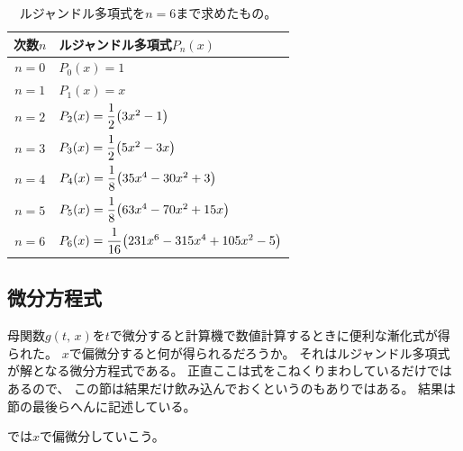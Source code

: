 \documentclass[../../master.tex]{subfiles}
\begin{document}
\begin{table}[htb]
	\centering
	\caption{ルジャンドル多項式を\(n=6\)まで求めたもの。}
	\begin{tabular}{cl}
		\hline
		次数\(n\) & ルジャンドル多項式\(P_n(x)\)                                   \\
		\hline \hline
		\(n=0\) & \(P_0(x)= 1\)                                         \\
		\(n=1\) & \(P_1(x)= x\)                                         \\
		\(n=2\) & \(P_2(x)= \dfrac{1}{2}\qty(3x^2-1)\)
		\rule[-4.5mm]{0mm}{9mm}                                         \\
		\(n=3\) & \(P_3(x)= \dfrac{1}{2}\qty(5x^2-3x)\)
		\rule[-4.5mm]{0mm}{9mm}                                         \\
		\(n=4\) & \(P_4(x)= \dfrac{1}{8}\qty(35x^4-30x^2+3)\)
		\rule[-4.5mm]{0mm}{9mm}                                         \\
		\(n=5\) & \(P_5(x)= \dfrac{1}{8}\qty(63x^4-70x^2+15x)\)
		\rule[-4.5mm]{0mm}{9mm}                                         \\
		\(n=6\) & \(P_6(x)= \dfrac{1}{16}\qty(231x^6-315x^4+105x^2-5)\)
		\rule[-4.5mm]{0mm}{9mm}                                         \\
		\hline
	\end{tabular}
\end{table}

\subsection{微分方程式}
母関数\(g(t,\,x)\)を\(t\)で微分すると計算機で数値計算するときに便利な漸化式が得られた。
\(x\)で偏微分すると何が得られるだろうか。
それはルジャンドル多項式が解となる微分方程式である。
正直ここは式をこねくりまわしているだけではあるので、
この節は結果だけ飲み込んでおくというのもありではある。
結果は節の最後らへんに記述している。

では\(x\)で偏微分していこう。
\end{document}
